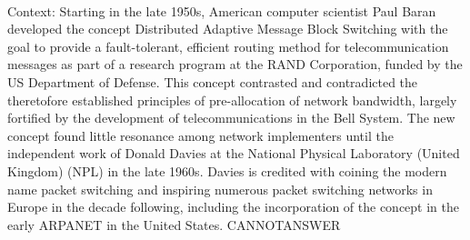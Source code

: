 \documentclass[11pt,a4paper, onecolumn]{article}
\begin{document}
\\ Context: Starting in the late 1950s, American computer scientist Paul Baran developed the concept Distributed Adaptive Message Block Switching with the goal to provide a fault-tolerant, efficient routing method for telecommunication messages as part of a research program at the RAND Corporation, funded by the US Department of Defense. This concept contrasted and contradicted the theretofore established principles of pre-allocation of network bandwidth, largely fortified by the development of telecommunications in the Bell System. The new concept found little resonance among network implementers until the independent work of Donald Davies at the National Physical Laboratory (United Kingdom) (NPL) in the late 1960s. Davies is credited with coining the modern name packet switching and inspiring numerous packet switching networks in Europe in the decade following, including the incorporation of the concept in the early ARPANET in the United States. CANNOTANSWER
\end{document}
